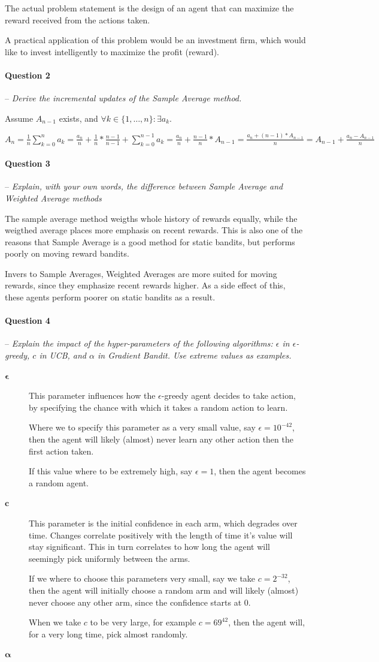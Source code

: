\documentclass[a4paper]{article}
\newcommand{\question}[2]{
\paragraph{Question #1} -- \textit{#2}

}
\begin{document}
			The actual problem statement is the design of an agent that can maximize the reward received from the actions taken.

			A practical application of this problem would be an investment firm, which would like to invest intelligently to maximize the profit (reward).

		\question{2}{Derive the incremental updates of the Sample Average method.}
			Assume $ A_{n-1} $ exists, and $ \forall k \in \{1,\dots,n\}: \exists a_k $.

			$ A_n = \frac{1}{n} \sum_{k=0}^{n}{a_k} = \frac{a_n}{n} + \frac{1}{n} * \frac{n-1}{n-1} + \sum_{k=0}^{n-1}{a_k} = \frac{a_n}{n} + \frac{n-1}{n} * A_{n-1} = \frac{a_n + (n-1) * A_{n-1}}{n} = A_{n-1} + \frac{a_n - A_{n-1}}{n} $

		\question{3}{Explain, with your own words, the difference between Sample Average and Weighted Average methods}
			The sample average method weigths whole history of rewards equally, while the weigthed average places more emphasis on recent rewards.
			This is also one of the reasons that Sample Average is a good method for static bandits, but performs poorly on moving reward bandits.

			Invers to Sample Averages, Weighted Averages are more suited for moving rewards, since they emphasize recent rewards higher.
			As a side effect of this, these agents perform poorer on static bandits as a result.

		\question{4}{Explain the impact of the hyper-parameters of the following algorithms: $\epsilon$ in $\epsilon$-greedy, $c$ in UCB, and $\alpha$ in Gradient Bandit. 
				Use extreme values as examples.}
			\begin{description}
				\item [$\boldsymbol{\epsilon}$] 
					This parameter influences how the $\epsilon$-greedy agent decides to take action, by specifying the chance with which it takes a random action to learn.

					Where we to specify this parameter as a very small value, say $\epsilon = 10^{-42}$, then the agent will likely (almost) never learn any other action then the first action taken.

					If this value where to be extremely high, say $\epsilon = 1$, then the agent becomes a random agent.
				\item [$\boldsymbol{c}$] 
					This parameter is the initial confidence in each arm, which degrades over time.  
					Changes correlate positively with the length of time it's value will stay significant.  
					This in turn correlates to how long the agent will seemingly pick uniformly between the arms.

					If we where to choose this parameters very small, say we take $c = 2^{-32}$, then the agent will initially choose a random arm and will likely (almost) never choose any other arm, since the confidence starts at 0.

					When we take $c$ to be very large, for example $c = 69^{42}$, then the agent will, for a very long time, pick almost randomly.
				\item [$\boldsymbol{\alpha}$]
			\end{description}
\end{document}
